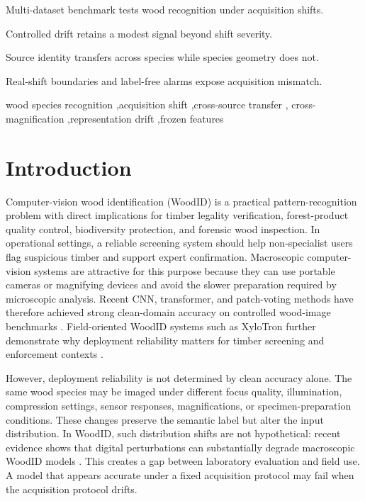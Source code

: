 \documentclass[a4paper,fleqn]{els-cas-templates/cas-sc}
\begin{document}
\begin{highlights}
\item Multi-dataset benchmark tests wood recognition under acquisition shifts.
\item Controlled drift retains a modest signal beyond shift severity.
\item Source identity transfers across species while species geometry does not.
\item Real-shift boundaries and label-free alarms expose acquisition mismatch.
\end{highlights}

\begin{keywords}
wood species recognition \sep acquisition shift \sep cross-source transfer \sep
cross-magnification \sep representation drift \sep frozen features
\end{keywords}

\maketitle

\section{Introduction}

Computer-vision wood identification (WoodID) is a practical pattern-recognition problem with direct implications for timber legality verification, forest-product quality control, biodiversity protection, and forensic wood inspection. In operational settings, a reliable screening system should help non-specialist users flag suspicious timber and support expert confirmation. Macroscopic computer-vision systems are attractive for this purpose because they can use portable cameras or magnifying devices and avoid the slower preparation required by microscopic analysis. Recent CNN, transformer, and patch-voting methods have therefore achieved strong clean-domain accuracy on controlled wood-image benchmarks \citep{paulafilho2014forest,sun2021smallwood,fabijanska2021woodcore,herrera2026goimai}. Field-oriented WoodID systems such as XyloTron further demonstrate why deployment reliability matters for timber screening and enforcement contexts \citep{ravindran2021field}.

However, deployment reliability is not determined by clean accuracy alone. The same wood species may be imaged under different focus quality, illumination, compression settings, sensor responses, magnifications, or specimen-preparation conditions. These changes preserve the semantic label but alter the input distribution. In WoodID, such distribution shifts are not hypothetical: recent evidence shows that digital perturbations can substantially degrade macroscopic WoodID models \citep{owens2025robustness}. This creates a gap between laboratory evaluation and field use. A model that appears accurate under a fixed acquisition protocol may fail when the acquisition protocol drifts.
\end{document}
